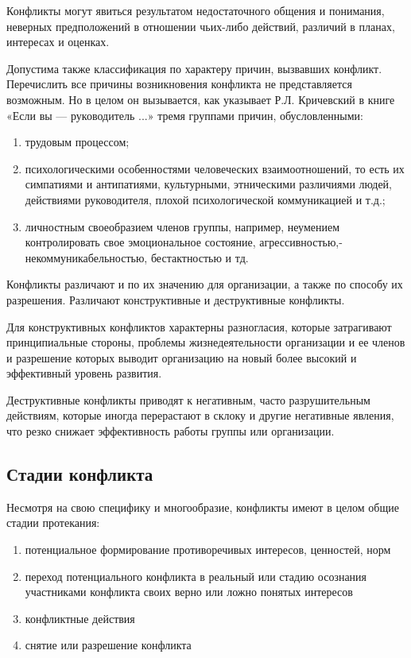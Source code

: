 \documentclass[a4paper,14pt]{extarticle}
\begin{document}
\hfill

Конфликты могут явиться результатом недостаточного общения и понимания, неверных предположений в отношении чьих-либо действий, различий в планах, интересах и оценках.

Допустима также классификация по характеру причин, вызвавших конфликт. Перечислить все причины возникновения конфликта не представляется возможным. Но в целом он вызывается, как указывает Р.Л. Кричевский в книге «Если вы — руководитель ...» тремя группами причин, обусловленными:

\begin{enumerate}
    \item трудовым процессом;
    \item психологическими особенностями человеческих взаимоотношений, то есть их симпатиями и антипатиями, культурными, этническими различиями людей, действиями руководителя, плохой психологической коммуникацией и т.д.;
    \item личностным своеобразием членов группы, например, неумением контролировать свое эмоциональное состояние, агрессивностью,- некоммуникабельностью, бестактностью и тд.
\end{enumerate}

Конфликты различают и по их значению для организации, а также по способу их разрешения. Различают конструктивные и деструктивные конфликты.

Для конструктивных конфликтов характерны разногласия, которые затрагивают принципиальные стороны, проблемы жизнедеятельности организации и ее членов и разрешение которых выводит организацию на новый более высокий и эффективный уровень развития.

Деструктивные конфликты приводят к негативным, часто разрушительным действиям, которые иногда перерастают в склоку и другие негативные явления, что резко снижает эффективность работы группы или организации.

\subsection{Стадии конфликта}

Несмотря на свою специфику и многообразие, конфликты имеют в целом общие стадии протекания:

\begin{enumerate}
    \item потенциальное формирование противоречивых интересов, ценностей, норм
    \item переход потенциального конфликта в реальный или стадию осознания участниками конфликта своих верно или ложно понятых интересов
    \item конфликтные действия
    \item снятие или разрешение конфликта
\end{enumerate}
\end{document}
